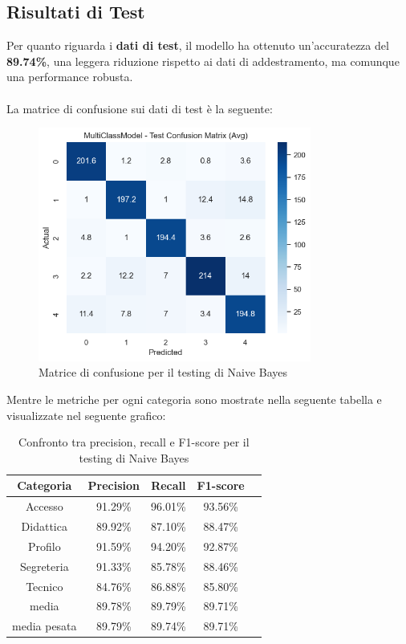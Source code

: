 \subsection{Risultati di Test}

Per quanto riguarda i \textbf{dati di test}, il modello ha ottenuto un'accuratezza del \textbf{89.74\%}, una leggera riduzione rispetto ai dati di addestramento, ma comunque una performance robusta. \\ \\
La matrice di confusione sui dati di test è la seguente:

\begin{figure}[H]
    \centering
    \includegraphics[width=0.8\textwidth]{images/confusion_matrix_test_naive_bayes.png}
    \caption{Matrice di confusione per il testing di Naive Bayes}
    \label{fig:confusion_matrix_test_naive_bayes}
\end{figure}

Mentre le metriche per ogni categoria sono mostrate nella seguente tabella e visualizzate nel seguente grafico:

\begin{table}[H]
    \centering
    \begin{tabular}{|c|c|c|c|c|}
        \hline
        \textbf{Categoria} & \textbf{Precision} & \textbf{Recall} & \textbf{F1-score} \\
        \hline
        Accesso & 91.29\% & 96.01\% & 93.56\% \\
        \hline
        Didattica & 89.92\% & 87.10\% & 88.47\% \\
        \hline
        Profilo & 91.59\% & 94.20\% & 92.87\% \\
        \hline
        Segreteria & 91.33\% & 85.78\% & 88.46\% \\
        \hline
        Tecnico & 84.76\% & 86.88\% & 85.80\% \\
        \hline
        media & 89.78\% & 89.79\% & 89.71\% \\
        \hline
        media pesata & 89.79\% & 89.74\% & 89.71\% \\
        \hline
    \end{tabular}
    \caption{Confronto tra precision, recall e F1-score per il testing di Naive Bayes}
    \label{tab:metriche_naive_bayes_test}
\end{table}

